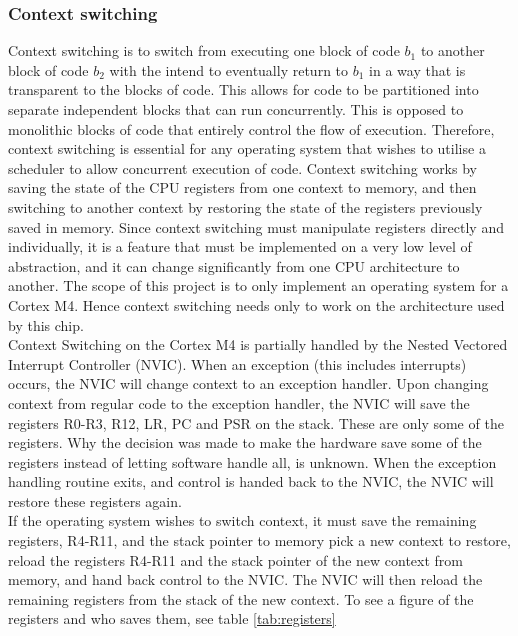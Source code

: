 \subsubsection{Context switching}
Context switching is to switch from executing one block of code $b_1$ to another block of code $b_2$
with the intend to eventually return to $b_1$ in a way that is transparent to the blocks of code.
This allows for code to be partitioned into separate independent blocks that can run concurrently.
This is opposed to monolithic blocks of code that entirely control the flow of execution.
Therefore, context switching is essential for any operating system that wishes to utilise a scheduler to allow concurrent execution of code.
Context switching works by saving the state of the CPU registers from one context to memory,
and then switching to another context by restoring the state of the registers previously saved in memory.
Since context switching must manipulate registers directly and individually, it is a feature that must be implemented
on a very low level of abstraction, and it can change significantly from one CPU architecture to another.
The scope of this project is to only implement an operating system for a Cortex M4. Hence context switching needs only
to work on the architecture used by this chip.\\
Context Switching on the Cortex M4 is partially handled by the Nested Vectored Interrupt Controller (NVIC).
When an exception (this includes interrupts) occurs, the NVIC will change context to an exception handler.
Upon changing context from regular code to the exception handler, the NVIC will save the registers R0-R3, R12, LR, PC and PSR
on the stack. These are only some of the registers. Why the decision was made to make the hardware save some of the
registers instead of letting software handle all, is unknown. 
When the exception handling routine exits, and control is handed back to the NVIC,
the NVIC will restore these registers again.\\
If the operating system wishes to switch context, it must save the remaining registers, R4-R11, and the stack pointer to memory
pick a new context to restore, reload the registers R4-R11 and the stack pointer of the new context from memory,
and hand back control to the NVIC. The NVIC will then reload the remaining
registers from the stack of the new context. To see a figure of the registers
and who saves them, see table \ref{tab:registers}\\

